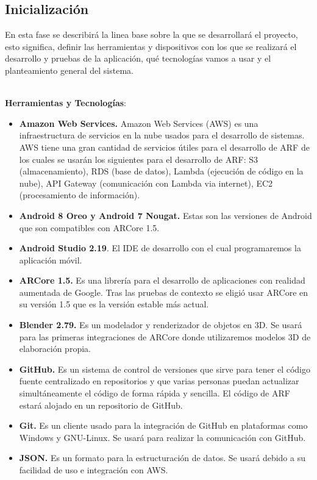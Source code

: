 \subsection{Inicialización}
En esta fase se describirá la linea base sobre la que se desarrollará el proyecto, esto significa, definir las herramientas y dispositivos con los que se realizará el desarrollo y pruebas de la aplicación, qué tecnologías vamos a usar y el planteamiento general del sistema.\par
\noindent
\\
\textbf{Herramientas y Tecnologías}:
	\begin{itemize}
			\item \textbf{Amazon Web Services.} Amazon Web Services (AWS) es una infraestructura de servicios en la nube usados para el desarrollo de sistemas. AWS tiene una gran cantidad de servicios útiles para el desarrollo de ARF de los cuales se usarán los siguientes para el desarrollo de ARF: S3 (almacenamiento), RDS (base de datos), Lambda (ejecución de código en la nube), API Gateway (comunicación con Lambda via internet), EC2 (procesamiento de información).
			\item \textbf{Android 8 Oreo y Android 7 Nougat.} Estas son las versiones de Android que son compatibles con ARCore 1.5.
			\item \textbf{Android Studio 2.19}. El IDE de desarrollo con el cual programaremos la aplicación móvil.
			\item \textbf{ARCore 1.5.} Es una librería para el desarrollo de aplicaciones con realidad aumentada de Google. Tras las pruebas de contexto se eligió usar ARCore en su versión 1.5 que es la versión estable más actual.
			\item \textbf{Blender 2.79.} Es un modelador y renderizador de objetos en 3D. Se usará para las primeras integraciones de ARCore donde utilizaremos modelos 3D de elaboración propia.
			\item \textbf{GitHub.} Es un sistema de control de versiones que sirve para tener el código fuente centralizado en repositorios y que varias personas puedan actualizar simultáneamente el código de forma rápida y sencilla. El código de ARF estará alojado en un repositorio de GitHub.
			\item \textbf{Git.} Es un cliente usado para la integración de GitHub en plataformas como Windows y GNU-Linux. Se usará para realizar la comunicación con GitHub.
	  		\item \textbf{JSON.} Es un formato para la estructuración de datos. Se usará debido a su facilidad de uso e integración con AWS.
	\end{itemize}
